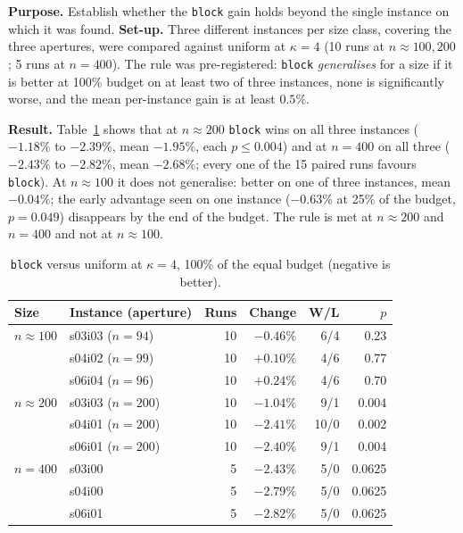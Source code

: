 \textbf{Purpose.} Establish whether the \texttt{block} gain holds beyond the single instance on which it was found. \textbf{Set-up.} Three different instances per size class, covering the three apertures, were compared against uniform at $\kappa=4$ (10 runs at $n\approx100,200$; 5 runs at $n=400$). The rule was pre-registered: \texttt{block} \emph{generalises} for a size if it is better at 100\% budget on at least two of three instances, none is significantly worse, and the mean per-instance gain is at least $0.5\%$.

\textbf{Result.} Table~\ref{tab:validate} shows that at $n\approx200$ \texttt{block} wins on all three instances ($-1.18\%$ to $-2.39\%$, mean $-1.95\%$, each $p\le0.004$) and at $n=400$ on all three ($-2.43\%$ to $-2.82\%$, mean $-2.68\%$; every one of the 15 paired runs favours \texttt{block}). At $n\approx100$ it does not generalise: better on one of three instances, mean $-0.04\%$; the early advantage seen on one instance ($-0.63\%$ at 25\% of the budget, $p=0.049$) disappears by the end of the budget. The rule is met at $n\approx200$ and $n=400$ and not at $n\approx100$.

\begin{table}[htbp]
\centering
\caption{\texttt{block} versus uniform at $\kappa=4$, 100\% of the equal budget (negative is better).}
\label{tab:validate}
\small
\begin{tabular}{llrrrr}
\toprule
\textbf{Size} & \textbf{Instance (aperture)} & \textbf{Runs} & \textbf{Change} & \textbf{W/L} & $p$\\
\midrule
$n\approx100$ & s03i03 ($n=94$) & 10 & $-0.46\%$ & 6/4 & 0.23\\
 & s04i02 ($n=99$) & 10 & $+0.10\%$ & 4/6 & 0.77\\
 & s06i04 ($n=96$) & 10 & $+0.24\%$ & 4/6 & 0.70\\
\midrule
$n\approx200$ & s03i03 ($n=200$) & 10 & $-1.04\%$ & 9/1 & 0.004\\
 & s04i01 ($n=200$) & 10 & $-2.41\%$ & 10/0 & 0.002\\
 & s06i01 ($n=200$) & 10 & $-2.40\%$ & 9/1 & 0.004\\
\midrule
$n=400$ & s03i00 & 5 & $-2.43\%$ & 5/0 & 0.0625\\
 & s04i00 & 5 & $-2.79\%$ & 5/0 & 0.0625\\
 & s06i01 & 5 & $-2.82\%$ & 5/0 & 0.0625\\
\bottomrule
\end{tabular}
\end{table}

